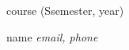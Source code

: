 \documentclass{article}
\begin{document}
    \verticalspace{1in}

    \begin{center}
        \fontsize{46}{46}\selectfont
        {{course}} (S{{semester}}, {{year}})
    \end{center}

    \verticalspace{6in}

    \begin{center}
        \fontsize{34}{34}\selectfont
        {{name}}
        \emph{{{email}}, {{phone}}}
    \end{center}
\end{document}
